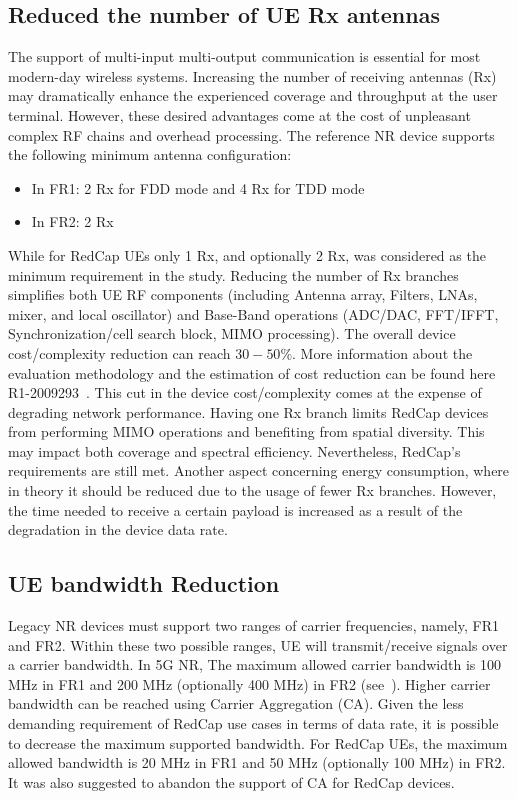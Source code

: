 \documentclass[]{IEEEtran}
\begin{document}
\subsection{Reduced the number of UE Rx antennas}
\label{sec:4-1}
The support of multi-input multi-output communication is essential for most modern-day wireless systems.
Increasing the number of receiving antennas (Rx) may dramatically enhance the experienced coverage and throughput at the user terminal.
However, these desired advantages come at the cost of unpleasant complex RF chains and overhead processing.
The reference NR device supports the following minimum antenna configuration:
\begin{itemize}
    \item In FR1: 2 Rx for FDD mode and 4 Rx for TDD mode
    \item In FR2: 2 Rx
\end{itemize}
While for RedCap UEs only 1 Rx, and optionally 2 Rx, was considered as the minimum requirement in the study.
Reducing the number of Rx branches simplifies both UE RF components (including Antenna array, Filters, LNAs, mixer, and local oscillator) and Base-Band operations (ADC/DAC, FFT/IFFT, Synchronization/cell search block, MIMO processing).
The overall device cost/complexity reduction can reach $30-50\%$.
More information about the evaluation methodology and the estimation of cost reduction can be found here R1-2009293~\cite{3gpp_fl_2022_R1-2009293}.
This cut in the device cost/complexity comes at the expense of degrading network performance.
Having one Rx branch limits RedCap devices from performing MIMO operations and benefiting from spatial diversity.
This may impact both coverage and spectral efficiency. Nevertheless, RedCap's requirements are still met.
Another aspect concerning energy consumption, where in theory it should be reduced due to the usage of fewer Rx branches.
However, the time needed to receive a certain payload is increased as a result of the degradation in the device data rate.

\subsection{UE bandwidth Reduction}
\label{sec:4-2}

Legacy NR devices must support two ranges of carrier frequencies, namely, FR1 and FR2.
Within these two possible ranges, UE will transmit/receive signals over a carrier bandwidth.
In 5G NR, The maximum allowed carrier bandwidth is 100 MHz in FR1 and 200 MHz (optionally 400 MHz) in FR2 (see~\cite{3gpp_nr_nodate-2_38.101-1,3gpp_nr_2022-7_38.101-2}).
Higher carrier bandwidth can be reached using Carrier Aggregation (CA).
Given the less demanding requirement of RedCap use cases in terms of data rate, it is possible to decrease the maximum supported bandwidth.
For RedCap UEs, the maximum allowed bandwidth is 20 MHz in FR1 and 50 MHz (optionally 100 MHz) in FR2.
It was also suggested to abandon the support of CA for RedCap devices.
\end{document}
